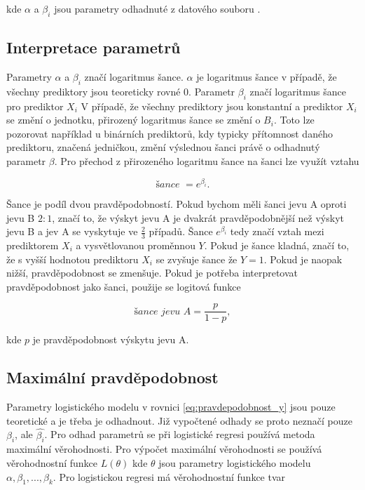 kde $\alpha$ a $\beta_i$ jsou parametry odhadnuté z datového souboru \cite{kleinbaum_logistic_2010}.

\subsection{Interpretace parametrů}
Parametry $\alpha$ a $\beta_i$ značí logaritmus šance. $\alpha$ je logaritmus šance v případě, že všechny prediktory
jsou teoreticky rovné $0$. Parametr $\beta_i$ značí logaritmus šance pro prediktor $X_i$
V případě, že všechny prediktory jsou konstantní a prediktor $X_i$ se změní o jednotku, přirozený logaritmus
šance se změní o $B_i$. Toto lze pozorovat například u binárních prediktorů, kdy typicky přítomnost
daného prediktoru, značená jedničkou, změní výslednou šanci právě o odhadnutý parametr $\beta$.
Pro přechod z přirozeného logaritmu šance na šanci lze využít vztahu

\begin{equation*}
\textit{šance } = e^{\beta_i}.
\end{equation*}

Šance je podíl dvou pravděpodobností. Pokud bychom měli šanci jevu A oproti jevu B $2 : 1$, značí to, že výskyt jevu A je dvakrát pravděpodobnější než
výskyt jevu B a jev A se vyskytuje ve $\frac{2}{3}$ případů. Šance $e^{\beta_i}$ tedy značí vztah mezi prediktorem $X_i$ a vysvětlovanou proměnnou $Y$. Pokud je
šance kladná, značí to, že s vyšší hodnotou prediktoru $X_i$ se zvyšuje šance že $Y = 1$. Pokud je naopak nižší, pravděpodobnost se zmenšuje. Pokud je potřeba
interpretovat pravděpodobnost jako šanci, použije se logitová funkce

\begin{equation*}
    \label{eq:logitova_funkce}
    \textit{šance jevu A} = \frac{p}{1 - p},
\end{equation*}

kde $p$ je pravděpodobnost výskytu jevu A.

\subsection{Maximální pravděpodobnost}
Parametry logistického modelu v rovnici \ref{eq:pravdepodobnost_y} jsou pouze teoretické a je třeba je odhadnout. Již vypočtené odhady
se proto neznačí pouze $\beta_i$, ale $\hat{\beta_i}$. Pro odhad parametrů se při logistické regresi používá metoda maximální věrohodnosti. Pro výpočet
maximální věrohodnosti se používá věrohodnostní funkce $L(\theta)$ kde $\theta$ jsou parametry logistického modelu $\alpha, \beta_1, ..., \beta_k$.
Pro logistickou regresi má věrohodnostní funkce tvar

